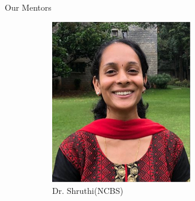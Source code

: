 \begin{frame}{Our Mentors}
    \begin{figure}[h]
        \centering
        \begin{subfigure}[b]{0.3\textwidth}
            \centering
            \includegraphics[width=\textwidth]{images/shruthi.png}
            \caption{Dr. Shruthi(NCBS)}
            \label{fig:image1}
        \end{subfigure}
        \hfill
        \begin{subfigure}[b]{0.3\textwidth}
            \centering

\end{subfigure}
\end{figure}
\end{frame}
